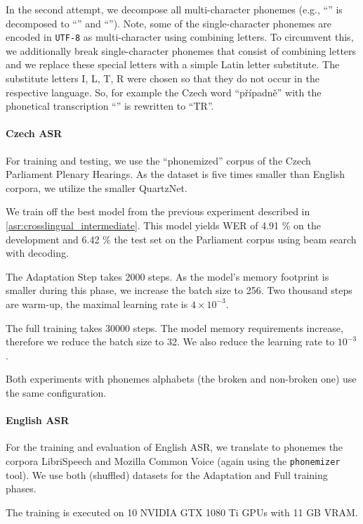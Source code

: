 In the second attempt, we decompose all multi-character phonemes (e.g., ``'' is decomposed to ``'' and ``''). Note, some of the single-character phonemes are encoded in \texttt{UTF-8} as multi-character using combining letters. To circumvent this, we additionally break single-character phonemes that consist of combining letters and we replace these special letters with a simple Latin letter substitute. The substitute letters I, L, T, R were chosen so that they do not occur in the respective language. So, for example the Czech word ``p\v{r}\'ipadn\v{e}'' with the phonetical transcription ``'' is rewritten to ``TR''.

\paragraph{Czech ASR}
For training and testing, we use the ``phonemized'' corpus of the Czech Parliament Plenary Hearings. As the dataset is five times smaller than English corpora, we utilize the smaller QuartzNet.

We train off the best model from the previous experiment described in \cref{asr:crosslingual_intermediate}. This model yields WER of 4.91 \% on the development and 6.42 \% the test set on the Parliament corpus using beam search with decoding.

The Adaptation Step takes 2000 steps. As the model's memory footprint is smaller during this phase, we increase the batch size to 256. Two thousand steps are warm-up, the maximal learning rate is $4 \times 10^{-3}$.

The full training takes 30000 steps. The model memory requirements increase, therefore we reduce the batch size to 32. We also reduce the learning rate to $10^{-3}$.

Both experiments with phonemes alphabets (the broken and non-broken one) use the same configuration.

\paragraph{English ASR}
For the training and evaluation of English ASR, we translate to pho\-ne\-mes the corpora LibriSpeech and Mozilla Common Voice (again using the \texttt{pho\-ne\-mi\-zer} tool). We use both (shuffled) datasets for the Adaptation and Full training phases.

The training is executed on 10 NVIDIA GTX 1080 Ti GPUs with 11 GB VRAM.

